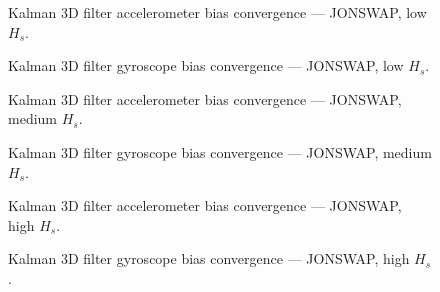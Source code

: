 \documentclass[11pt,letterpaper]{article}
\begin{document}
\begin{figure}[H]\centering
  \resizebox{\textwidth}{!}{}
  \caption{Kalman 3D filter accelerometer bias convergence — JONSWAP, low $H_s$.}
  \label{fig:w3d_jonswap_low_acc_bias}
\end{figure}

\begin{figure}[H]\centering
  \resizebox{\textwidth}{!}{}
  \caption{Kalman 3D filter gyroscope bias convergence — JONSWAP, low $H_s$.}
  \label{fig:w3d_jonswap_low_gyro_bias}
\end{figure}

\begin{figure}[H]\centering
  \resizebox{\textwidth}{!}{}
  \caption{Kalman 3D filter accelerometer bias convergence — JONSWAP, medium $H_s$.}
  \label{fig:w3d_jonswap_medium_acc_bias}
\end{figure}

\begin{figure}[H]\centering
  \resizebox{\textwidth}{!}{}
  \caption{Kalman 3D filter gyroscope bias convergence — JONSWAP, medium $H_s$.}
  \label{fig:w3d_jonswap_medium_gyro_bias}
\end{figure}

\begin{figure}[H]\centering
  \resizebox{\textwidth}{!}{}
  \caption{Kalman 3D filter accelerometer bias convergence — JONSWAP, high $H_s$.}
  \label{fig:w3d_jonswap_high_acc_bias}
\end{figure}

\begin{figure}[H]\centering
  \resizebox{\textwidth}{!}{}
  \caption{Kalman 3D filter gyroscope bias convergence — JONSWAP, high $H_s$.}
  \label{fig:w3d_jonswap_high_gyro_bias}
\end{figure}
\end{document}
